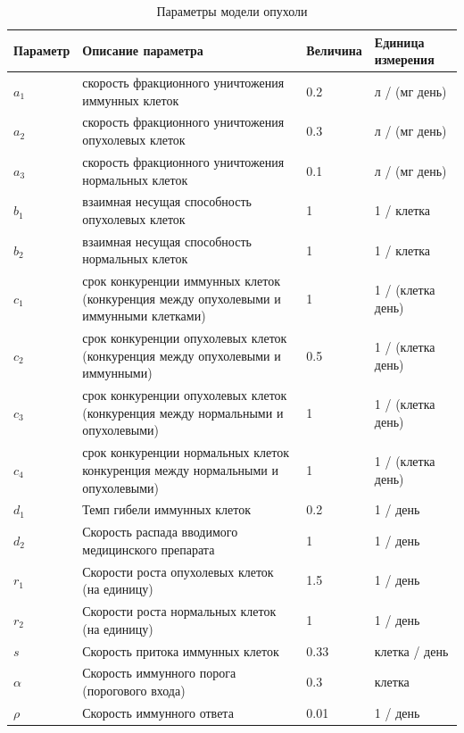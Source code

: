 \begin{table}[h!]
	\centering
	\small
	\caption{Параметры модели опухоли}
	\begin{tabular}{|p{45pt}|p{210pt}|p{50pt}|p{100pt}|}
		\hline
		Параметр  & Описание параметра  & Величина  & Единица измерения  \\
		\hline
		$a_1$ & скорость фракционного уничтожения иммунных клеток & 0.2 & л / (мг день)\\
		\hline
		$a_2$ & скорость фракционного уничтожения опухолевых клеток & 0.3 & л / (мг день)\\
		\hline
		$a_3$ & скорость фракционного уничтожения нормальных клеток & 0.1 & л / (мг день)\\
		\hline
		$b_1$ & взаимная несущая способность опухолевых клеток & 1 & 1 / клетка\\
		\hline
		$b_2$ & взаимная несущая способность нормальных клеток & 1 & 1 / клетка\\
		\hline
		$c_1$ & срок конкуренции иммунных клеток (конкуренция между опухолевыми и иммунными клетками) & 1 & 1 / (клетка день)\\
		\hline
		$c_2$ & срок конкуренции опухолевых клеток (конкуренция между опухолевыми и иммунными)& 0.5 & 1 / (клетка день)\\
		\hline
		$c_3$ & срок конкуренции опухолевых клеток (конкуренция между нормальными и опухолевыми) & 1 & 1 / (клетка день)\\
		\hline
		$c_4$ & срок конкуренции нормальных клеток конкуренция между нормальными и опухолевыми) & 1 & 1 / (клетка день)\\
		\hline
		$d_1$ & Темп гибели иммунных клеток & 0.2 & 1 / день\\
		\hline
		$d_2$ & Скорость распада вводимого медицинского препарата & 1 & 1 / день\\
		\hline
		$r_1$ & Скорости роста опухолевых клеток (на единицу) & 1.5 & 1 / день\\
		\hline
		$r_2$ & Скорости роста нормальных клеток (на единицу) & 1 & 1 / день\\
		\hline
		$s$ & Скорость притока иммунных клеток & 0.33 & клетка / день\\
		\hline
		$\alpha$ & Скорость иммунного порога (порогового входа) & 0.3 & клетка \\
		\hline
		$\rho$ & Скорость иммунного ответа & 0.01 & 1 / день\\
		\hline
		
	\end{tabular}
	\label{table:plana-ch3}
\end{table}
%

